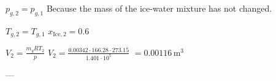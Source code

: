 \( p_{g,2} = p_{g,1} \)  
Because the mass of the ice-water mixture has not changed.  

\( T_{g,2} = T_{g,1} \)  
\( x_{\text{Ice},2} = 0.6 \)  

\( V_2 = \frac{m_g RT_2}{p} \)  
\( V_2 = \frac{0.00342 \cdot 166.28 \cdot 273.15}{1.401 \cdot 10^5} \)  
\( = 0.00116 \, \text{m}^3 \)  

---